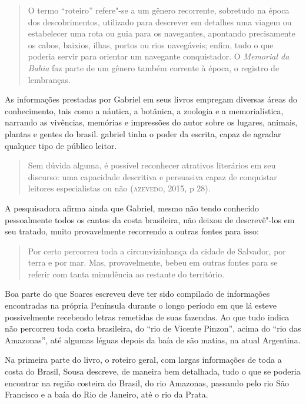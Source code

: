 \documentclass[12pt]{extarticle}
\begin{document}
\begin{quote}
O termo ``roteiro'' refere"-se a um gênero recorrente, sobretudo na época
dos descobrimentos, utilizado para descrever em detalhes uma viagem ou
estabelecer uma rota ou guia para os navegantes, apontando precisamente
os cabos, baixios, ilhas, portos ou rios navegáveis; enfim, tudo o que
poderia servir para orientar um navegante conquistador. O \textit{Memorial da
Bahia} faz parte de um gênero também corrente à época, o registro de
lembranças.
\end{quote}

As informações prestadas por Gabriel em seus livros empregam diversas
áreas do conhecimento, tais como a náutica, a botânica, a zoologia e a
memorialística, narrando as vivências, memórias e impressões do autor
sobre os lugares, animais, plantas e gentes do brasil. gabriel tinha o
poder da escrita, capaz de agradar qualquer tipo de público leitor.

\begin{quote}
Sem dúvida alguma, é possível reconhecer atrativos literários em seu
discurso: uma capacidade descritiva e persuasiva capaz de conquistar
leitores especialistas ou não (\textsc{azevedo}, 2015, p 28).
\end{quote}

A pesquisadora afirma ainda que Gabriel, mesmo não tendo conhecido
pessoalmente todos os cantos da costa brasileira, não deixou de
descrevê"-los em seu tratado, muito provavelmente recorrendo a outras
fontes para isso:

\begin{quote}
Por certo percorreu toda a circunvizinhança da cidade de Salvador, por
terra e por mar. Mas, provavelmente, bebeu em outras fontes para se
referir com tanta minudência ao restante do território.
\end{quote}

Boa parte do que Soares escreveu deve ter sido compilado de informações
encontradas na própria Península durante o longo período em que lá
esteve possivelmente recebendo letras remetidas de suas fazendas. Ao que
tudo indica não percorreu toda costa brasileira, do ``rio de Vicente
Pinzon'', acima do ``rio das Amazonas'', até algumas léguas depois da
baía de são matias, na atual Argentina.

Na primeira parte do livro, o roteiro geral, com largas informações de
toda a costa do Brasil, Sousa descreve, de maneira bem detalhada, tudo o
que se poderia encontrar na região costeira do Brasil, do rio Amazonas,
passando pelo rio São Francisco e a baía do Rio de Janeiro, até o rio da
Prata.
\end{document}
